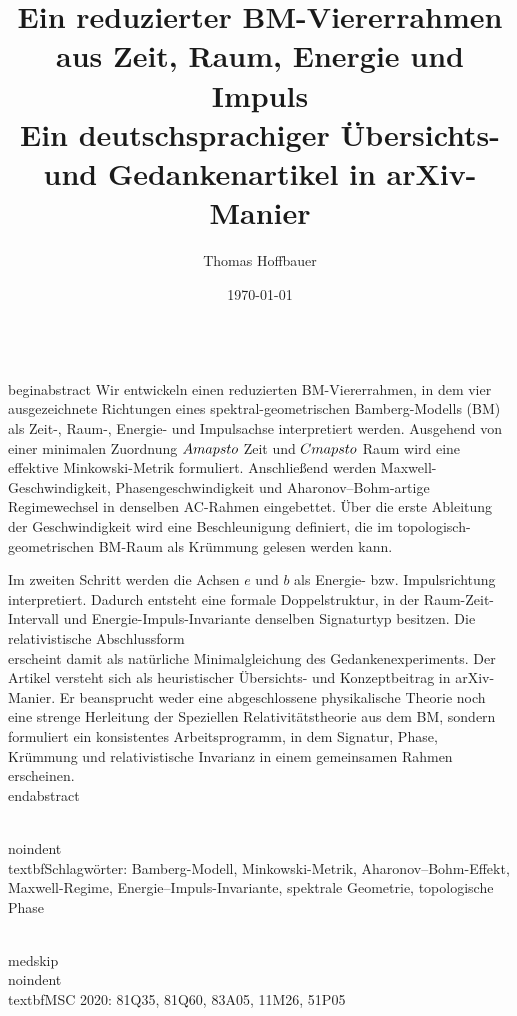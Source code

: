 \documentclass[11pt,a4paper]{article}
\title{Ein reduzierter BM-Viererrahmen aus Zeit, Raum, Energie und Impuls\\
	\large Ein deutschsprachiger Übersichts- und Gedankenartikel in arXiv-Manier}
\author{Thomas Hoffbauer}
\date{\today}
\theoremstyle{definition}
\theoremstyle{plain}
\begin{document}
	\maketitle
	
	\\begin{abstract}
	Wir entwickeln einen reduzierten BM-Viererrahmen, in dem vier ausgezeichnete Richtungen eines spektral-geometrischen Bamberg-Modells (BM) als Zeit-, Raum-, Energie- und Impulsachse interpretiert werden. Ausgehend von einer minimalen Zuordnung $A\\mapsto$ Zeit und $C\\mapsto$ Raum wird eine effektive Minkowski-Metrik formuliert. Anschließend werden Maxwell-Geschwindigkeit, Phasengeschwindigkeit und Aharonov--Bohm-artige Regimewechsel in denselben AC-Rahmen eingebettet. Über die erste Ableitung der Geschwindigkeit wird eine Beschleunigung definiert, die im topologisch-geometrischen BM-Raum als Krümmung gelesen werden kann.
	
	Im zweiten Schritt werden die Achsen $e$ und $b$ als Energie- bzw. Impulsrichtung interpretiert. Dadurch entsteht eine formale Doppelstruktur, in der Raum-Zeit-Intervall und Energie-Impuls-Invariante denselben Signaturtyp besitzen. Die relativistische Abschlussform
	\\[
	e^2 - c_M^2 b^2 = m_{\\mathrm{BM}}^2 c_M^4
	\\]
	erscheint damit als natürliche Minimalgleichung des Gedankenexperiments. Der Artikel versteht sich als heuristischer Übersichts- und Konzeptbeitrag in arXiv-Manier. Er beansprucht weder eine abgeschlossene physikalische Theorie noch eine strenge Herleitung der Speziellen Relativitätstheorie aus dem BM, sondern formuliert ein konsistentes Arbeitsprogramm, in dem Signatur, Phase, Krümmung und relativistische Invarianz in einem gemeinsamen Rahmen erscheinen.
	\\end{abstract}
	
	\\noindent\\textbf{Schlagwörter:} Bamberg-Modell, Minkowski-Metrik, Aharonov--Bohm-Effekt, Maxwell-Regime, Energie--Impuls-Invariante, spektrale Geometrie, topologische Phase
	
	\\medskip
	\\noindent\\textbf{MSC 2020:} 81Q35, 81Q60, 83A05, 11M26, 51P05
	
	\tableofcontents
	
\end{document}

